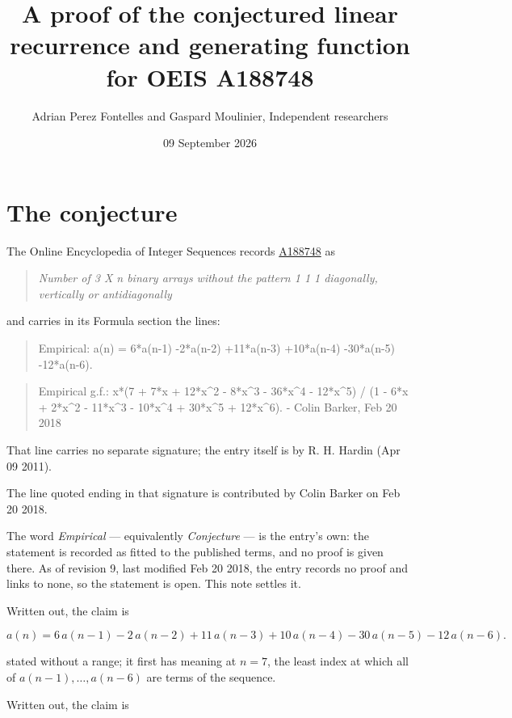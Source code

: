 \documentclass[11pt]{article}
\title{A proof of the conjectured linear recurrence and generating function for OEIS A188748}
\author{Adrian Perez Fontelles and Gaspard Moulinier, Independent researchers}
\date{09 September 2026}
\theoremstyle{definition}
\begin{document}
\maketitle
\section{The conjecture}

The Online Encyclopedia of Integer Sequences records \href{https://oeis.org/A188748}{A188748} as

\begin{quote}\itshape Number of 3 X n binary arrays without the pattern 1 1 1 diagonally, vertically or antidiagonally\end{quote}

and carries in its Formula section the lines:

\begin{quote}\ttfamily Empirical: a(n) = 6*a(n-1) -2*a(n-2) +11*a(n-3) +10*a(n-4) -30*a(n-5) -12*a(n-6).\end{quote}

\begin{quote}\ttfamily Empirical g.f.: x*(7 + 7*x + 12*x\textasciicircum{}2 - 8*x\textasciicircum{}3 - 36*x\textasciicircum{}4 - 12*x\textasciicircum{}5) / (1 - 6*x + 2*x\textasciicircum{}2 - 11*x\textasciicircum{}3 - 10*x\textasciicircum{}4 + 30*x\textasciicircum{}5 + 12*x\textasciicircum{}6). - Colin Barker, Feb 20 2018\end{quote}

That line carries no separate signature; the entry itself is by R. H. Hardin (Apr 09 2011).

The line quoted ending in that signature is contributed by Colin Barker on Feb 20 2018.

The word {\itshape Empirical} --- equivalently {\itshape Conjecture} --- is the entry's own: the statement is recorded as fitted to the published terms, and no proof is given there. As of revision 9, last modified Feb 20 2018, the entry records no proof and links to none, so the statement is open. This note settles it.

Written out, the claim is

\[a(n) = 6\,a(n-1) - 2\,a(n-2) + 11\,a(n-3) + 10\,a(n-4) - 30\,a(n-5) - 12\,a(n-6).\]

stated without a range; it first has meaning at $n = 7$, the least index at which all of $a(n-1),\dots,a(n-6)$ are terms of the sequence.

Written out, the claim is
\end{document}
